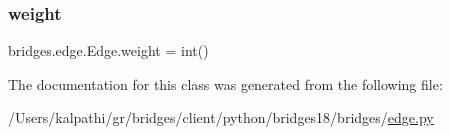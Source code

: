 \subsubsection{\texorpdfstring{weight}{weight}}
{\footnotesize\ttfamily bridges.\+edge.\+Edge.\+weight = int()\hspace{0.3cm}{\ttfamily [static]}}



The documentation for this class was generated from the following file\+:\begin{DoxyCompactItemize}
\item 
/\+Users/kalpathi/gr/bridges/client/python/bridges18/bridges/\mbox{\hyperlink{edge_8py}{edge.\+py}}\end{DoxyCompactItemize}

